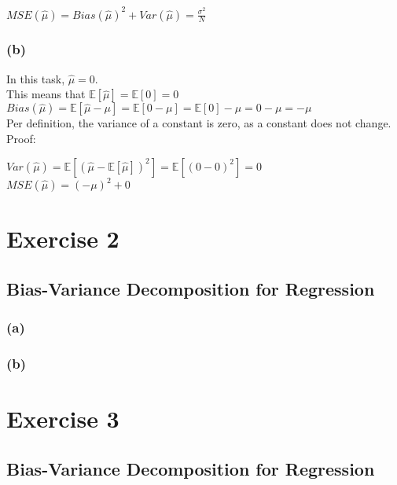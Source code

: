 \documentclass{article}
\begin{document}
$MSE(\hat{\mu})= Bias(\hat{\mu})^2 + Var(\hat{\mu}) = \frac{\sigma^2}{N}$

\subsubsection*{(b)}

In this task, $\hat{\mu} = 0$. \\

This means that $\mathbb{E}[\hat{\mu}]=\mathbb{E}[0]=0$ \\

$Bias(\hat{\mu})= \mathbb{E}[\hat{\mu} - \mu] = \mathbb{E}[0 - \mu] = \mathbb{E}[0] - \mu = 0 - \mu = - \mu$ \\

Per definition, the variance of a constant is zero, as a constant does not change. Proof:

$Var(\hat{\mu})= \mathbb{E}[(\hat{\mu} - \mathbb{E}[\hat{\mu}])^2] = \mathbb{E}[(0 - 0)^2] = 0$\\

$MSE(\hat{\mu})=(-\mu)^2 + 0$

\section*{Exercise 2}
\subsection*{Bias-Variance Decomposition for Regression}
\subsubsection*{(a)}


\subsubsection*{(b)}


\section*{Exercise 3}
\subsection*{Bias-Variance Decomposition for Regression}
\end{document}

